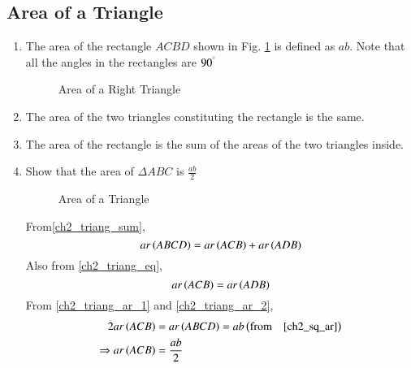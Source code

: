 \subsection{Area of a Triangle}
\renewcommand{\theequation}{\theenumi}
\begin{enumerate}[label=\arabic*.,ref=\thesubsection.\theenumi]
%



\item
	The area of the rectangle $ACBD$ shown in Fig. \ref{ch2_sq_ar} is defined as $ab$. Note that all the angles in the rectangles are $90^{\degree}$

\begin{figure}[!ht]
	\begin{center}
		
		\resizebox{\columnwidth}{!}{}
	\end{center}
	\caption{Area of a Right Triangle}
	\label{ch2_sq_ar}	
\end{figure}

\item
	The area of the two triangles constituting the rectangle is the same.
	\label{ch2_triang_eq}

\item
	The area of the rectangle is the sum of the areas of the two triangles inside.
	\label{ch2_triang_sum}


\item
	Show that the area of $\Delta ABC$ is $\frac{ab}{2}$

\begin{figure}[!ht]
	\begin{center}
		
		\resizebox{\columnwidth}{!}{}
	\end{center}
	\caption{Area of a Triangle}
	\label{ch2_triang_ar}	
\end{figure}

\solution From\eqref{ch2_triang_sum},
\begin{equation}
\label{ch2_triang_ar_1}
ar\left(ABCD\right) = ar\left(ACB\right) + ar\left(ADB\right)
\end{equation}
Also from \eqref{ch2_triang_eq},
\begin{equation}
\label{ch2_triang_ar_2}
ar\left(ACB\right) = ar\left(ADB\right)
\end{equation}
From \eqref{ch2_triang_ar_1} and \eqref{ch2_triang_ar_2},
\begin{align}
2ar\left(ACB\right) &= ar\left(ABCD\right) = ab \left(\text{from} \quad \eqref{ch2_sq_ar}\right)
\\
\Rightarrow ar\left(ACB\right) &= \frac{ab}{2}
\end{align}


\end{enumerate}
